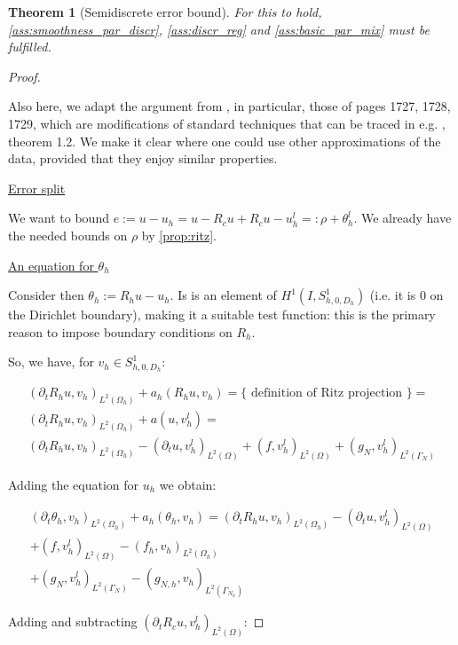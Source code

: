 \documentclass[english,a4paper,9pt,oneside]{scrbook}	%
\theoremstyle{break}
\newtheorem{thm}[equation]{Theorem}
\newenvironment{mproof}[1][\proofname]{%
  \begin{proof}[#1]$ $\par\nobreak\ignorespaces
}{%
  \end{proof}
}
\renewcommand*{\proofname}{Proof}
\theoremstyle{remark}
\newcommand{\ind}[1]{\{\text{ #1 }\}}
\begin{document}
\begin{appendices}
\begin{thm}[Semidiscrete error bound]
For this to hold, \cref{ass:smoothness_par_discr}, \cref{ass:discr_reg} and \cref{ass:basic_par_mix} must be fulfilled.

\end{thm}

\begin{mproof}

Also here, we adapt the argument from \cite{ranner}, in particular, those of pages 1727, 1728, 1729, which are modifications of standard techniques that can be traced in e.g. \cite{thomee}, theorem 1.2. We make it clear where one could use other approximations of the data, provided that they enjoy similar properties.

\underline{Error split}

We want to bound $e:=u-u_h = u-R_cu +R_c u -u_h^l =: \rho + \theta_h^l$. We already have the needed bounds on $\rho$ by \cref{prop:ritz}.

\underline{An equation for $\theta_h$}

Consider then $\theta_h := R_h u -u_h$. Is is an element of $H^1(I,S^1_{h,0,D_h})$ (i.e. it is $0$ on the Dirichlet boundary), making it a suitable test function: this is the primary reason to impose boundary conditions on $R_h$.

So, we have, for $v_h \in S^1_{h,0,D_h}$:

\begin{align*}
(\partial_t R_h u , v_h)_{L^2(\Omega_h)} + a_h(R_h u, v_h) = \ind{definition of Ritz projection}=\\
(\partial_t R_h u , v_h)_{L^2(\Omega_h)} + a(u, v_h^l) =\\
(\partial_t R_h u , v_h)_{L^2(\Omega_h)} - (\partial_t u, v_h^l)_{L^2(\Omega)} + (f, v_h^l)_{L^2(\Omega)} + (g_{N}, v_h^l)_{L^2(\Gamma_{N})} 
\end{align*}

Adding the equation for $u_h$ we obtain:

\begin{align*}
(\partial_t \theta_h , v_h)_{L^2(\Omega_h)} + a_h(\theta_h, v_h) = 
(\partial_t R_h u , v_h)_{L^2(\Omega_h)} - (\partial_t u, v_h^l)_{L^2(\Omega)}\\ + (f, v_h^l)_{L^2(\Omega)} - (f_h, v_h)_{L^2(\Omega_h)}\\ + (g_{N}, v_h^l)_{L^2(\Gamma_{N})} - (g_{N,h}, v_h)_{L^2(\Gamma_{N_h})} 
\end{align*}

Adding and subtracting $(\partial_t R_cu, v_h^l)_{L^2(\Omega)}$:



\end{mproof}
\end{appendices}
\end{document}
